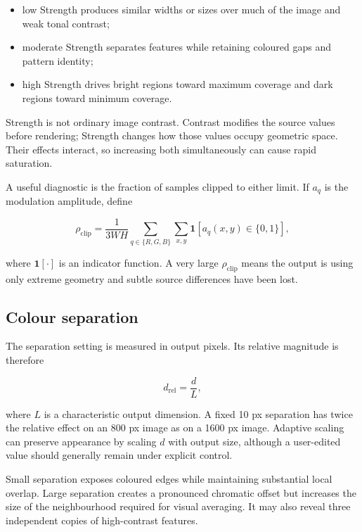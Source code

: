 \begin{itemize}
  \item low Strength produces similar widths or sizes over much of the image and weak tonal contrast;
  \item moderate Strength separates features while retaining coloured gaps and pattern identity;
  \item high Strength drives bright regions toward maximum coverage and dark regions toward minimum coverage.
\end{itemize}

Strength is not ordinary image contrast. Contrast modifies the source values before rendering; Strength changes how those values occupy geometric space. Their effects interact, so increasing both simultaneously can cause rapid saturation.

A useful diagnostic is the fraction of samples clipped to either limit. If $a_q$ is the modulation amplitude, define

\begin{equation}
\rho_{\mathrm{clip}}=
\frac{1}{3WH}
\sum_{q\in\{R,G,B\}}
\sum_{x,y}
\mathbf{1}\!\left[a_q(x,y)\in\{0,1\}\right],
\label{eq:clipfraction}
\end{equation}

where $\mathbf{1}[\cdot]$ is an indicator function. A very large $\rho_{\mathrm{clip}}$ means the output is using only extreme geometry and subtle source differences have been lost.

\subsection{Colour separation}

The separation setting is measured in output pixels. Its relative magnitude is therefore

\begin{equation}
d_{\mathrm{rel}}=\frac{d}{L},
\label{eq:relsep}
\end{equation}

where $L$ is a characteristic output dimension. A fixed 10 px separation has twice the relative effect on an 800 px image as on a 1600 px image. Adaptive scaling can preserve appearance by scaling $d$ with output size, although a user-edited value should generally remain under explicit control.

Small separation exposes coloured edges while maintaining substantial local overlap. Large separation creates a pronounced chromatic offset but increases the size of the neighbourhood required for visual averaging. It may also reveal three independent copies of high-contrast features.

